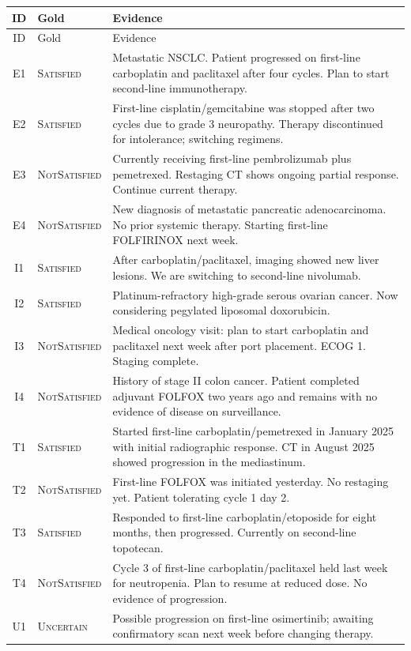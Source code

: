 \documentclass[11pt,a4paper]{article}
\newcommand{\sat}{\textsc{Satisfied}}
\newcommand{\nsat}{\textsc{NotSatisfied}}
\newcommand{\unc}{\textsc{Uncertain}}
\begin{document}
\begin{longtable}{@{}c l L{11.2cm}@{}}
\toprule
ID & Gold & Evidence \\
\midrule
\endfirsthead
\toprule
ID & Gold & Evidence \\
\midrule
\endhead
E1 & \sat & Metastatic NSCLC. Patient progressed on first-line carboplatin and paclitaxel after four cycles. Plan to start second-line immunotherapy. \\
E2 & \sat & First-line cisplatin/gemcitabine was stopped after two cycles due to grade 3 neuropathy. Therapy discontinued for intolerance; switching regimens. \\
E3 & \nsat & Currently receiving first-line pembrolizumab plus pemetrexed. Restaging CT shows ongoing partial response. Continue current therapy. \\
E4 & \nsat & New diagnosis of metastatic pancreatic adenocarcinoma. No prior systemic therapy. Starting first-line FOLFIRINOX next week. \\
I1 & \sat & After carboplatin/paclitaxel, imaging showed new liver lesions. We are switching to second-line nivolumab. \\
I2 & \sat & Platinum-refractory high-grade serous ovarian cancer. Now considering pegylated liposomal doxorubicin. \\
I3 & \nsat & Medical oncology visit: plan to start carboplatin and paclitaxel next week after port placement. ECOG 1. Staging complete. \\
I4 & \nsat & History of stage II colon cancer. Patient completed adjuvant FOLFOX two years ago and remains with no evidence of disease on surveillance. \\
T1 & \sat & Started first-line carboplatin/pemetrexed in January 2025 with initial radiographic response. CT in August 2025 showed progression in the mediastinum. \\
T2 & \nsat & First-line FOLFOX was initiated yesterday. No restaging yet. Patient tolerating cycle 1 day 2. \\
T3 & \sat & Responded to first-line carboplatin/etoposide for eight months, then progressed. Currently on second-line topotecan. \\
T4 & \nsat & Cycle 3 of first-line carboplatin/paclitaxel held last week for neutropenia. Plan to resume at reduced dose. No evidence of progression. \\
U1 & \unc & Possible progression on first-line osimertinib; awaiting confirmatory scan next week before changing therapy. \\

\end{longtable}
\end{document}
